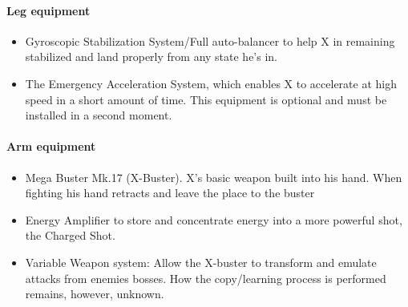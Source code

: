 \paragraph{Leg equipment}
\begin{itemize}
	\item Gyroscopic Stabilization System/Full auto-balancer to help X in remaining stabilized and land properly from any state he's in.
	\item The Emergency Acceleration System, which enables X to accelerate at high speed in a short amount of time. This equipment is optional and must be installed in a second moment.
\end{itemize}

\paragraph{Arm equipment}
\begin{itemize}
	\item Mega Buster Mk.17 (X-Buster). X’s basic weapon built into his hand. When fighting his hand retracts and leave the place to the buster~\cite{elysium_weapons}
	\item Energy Amplifier to store and concentrate energy into a more powerful shot, the Charged Shot.
	\item Variable Weapon system: Allow the X-buster to transform and emulate attacks from enemies bosses. How the copy/learning process is performed remains, however, unknown.
\end{itemize}


